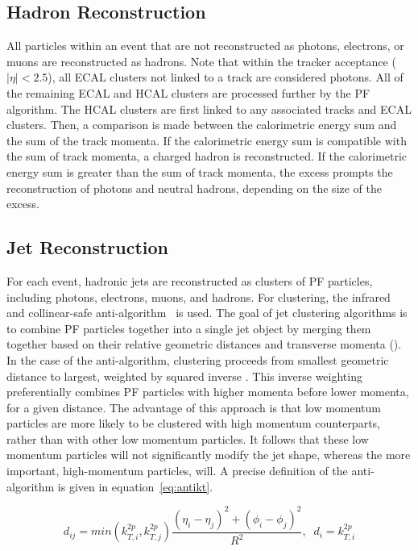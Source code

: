 \subsection{Hadron Reconstruction}
All particles within an event that are not reconstructed as photons, electrons, or muons are reconstructed as hadrons. Note that within the tracker acceptance ($|\eta|<2.5$), all ECAL clusters 
not linked to a track are considered photons. All of the remaining ECAL and HCAL clusters are processed further by the PF algorithm. The HCAL clusters are 
first linked to any associated tracks and ECAL clusters. Then, a comparison is made between the calorimetric energy sum and the sum of the track momenta. If the calorimetric energy sum is 
compatible with the sum of track momenta, a charged hadron is reconstructed. If the calorimetric energy sum is greater than the sum of track momenta, the excess prompts the reconstruction of photons and neutral hadrons, depending on the size of the excess. 

\subsection{Jet Reconstruction}
For each event, hadronic jets are reconstructed as clusters of PF particles, including photons, electrons, muons, and hadrons. For clustering, the infrared and collinear-safe anti-\kt algorithm~\cite{Cacciari:2008gp, Cacciari:2011ma} is used. The goal of jet clustering algorithms is to combine PF particles together into a single jet object by merging them together based on their relative geometric distances and transverse momenta (\kt). In the case of the anti-\kt algorithm, clustering proceeds from smallest geometric distance to largest, weighted by squared inverse \kt. This inverse weighting 
preferentially combines PF particles with higher momenta before lower momenta, for a given distance. The advantage of this approach is that low momentum particles are more likely to be clustered 
with high momentum counterparts, rather than with other low momentum particles. It follows that these low momentum particles will not significantly modify the jet shape, whereas the more important, high-momentum particles, will. A precise definition of the anti-\kt algorithm is given in equation~\ref{eq:antikt}. 

\begin{equation}
	d_{ij} = min(k_{T,i}^{2p}, k_{T,j}^{2p})\frac{(\eta_i - \eta_j)^2 + (\phi_i - \phi_j)^2}{R^2},\;\; d_i = k_{T,i}^{2p}
	\label{eq:antikt}
\end{equation}

